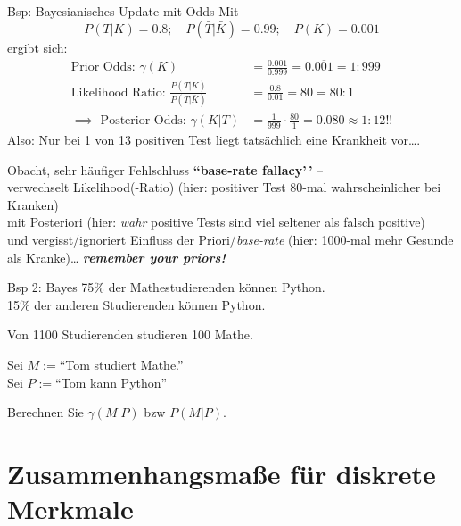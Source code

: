 \documentclass[
  10pt,
  ignorenonframetext,
]{beamer}
\begin{document}
\begin{frame}{Bsp: Bayesianisches Update mit Odds}
\label{bsp-bayesianisches-update-mit-odds}
Mit \[P(T|K) = 0.8; \quad P(\bar{T}|\bar{K}) = 0.99; \quad
P(K) = 0.001\] ergibt sich: \begin{align*}
\text{Prior Odds: } \gamma(K) &= \frac{0.001}{0.999} = 0.\overline{001} = 1:999 \\
\text{Likelihood Ratio: } \frac{P(T|K)}{P(T|\bar K)} &= \frac{0.8}{0.01} = 80 = 80:1  \\
\implies\text{ Posterior Odds: } \gamma(K|T) &= \tfrac{1}{999} \cdot \tfrac{80}{1} = 0.\overline{080} \approx 1:12 !!
\end{align*} Also: Nur bei 1 von 13 positiven Test liegt tatsächlich
eine Krankheit vor\ldots.

Obacht, sehr häufiger Fehlschluss \textbf{``base-rate fallacy'\,'} --\\
verwechselt Likelihood(-Ratio) (hier: positiver Test 80-mal
wahrscheinlicher bei Kranken)\\
mit Posteriori (hier: \emph{wahr} positive Tests sind viel seltener als
falsch positive)\\
und vergisst/ignoriert Einfluss der Priori/\emph{base-rate} (hier:
1000-mal mehr Gesunde als Kranke)\ldots{} \textbf{\emph{remember your
priors!}}

\end{frame}

\begin{frame}{Bsp 2: Bayes}
\label{bsp-2-bayes}
75\% der Mathestudierenden können Python.\\
15\% der anderen Studierenden können Python.

Von 1100 Studierenden studieren 100 Mathe.

Sei \(M:=\)``Tom studiert Mathe.''\\
Sei \(P:=\)``Tom kann Python''

Berechnen Sie \(\gamma(M|P)\) bzw \(P(M|P)\).
\end{frame}

\section{Zusammenhangsmaße für diskrete
Merkmale}\label{zusammenhangsmauxdfe-fuxfcr-diskrete-merkmale}
\end{document}
